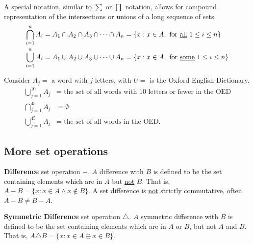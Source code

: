 A special notation, similar to $\sum$ or $\prod$ notation, allows for compound representation of the
intersections or unions of a long sequence of sets.
\begin{align*}
  \bigcap_{i=1}^{n} A_{i} & = A_1 \cap A_2 \cap A_3 \cap \cdots \cap A_n = \{x : x \in A, \text{ for \underline{all} } 1 \leq i \leq n\}  \\
  \bigcup_{i=1}^{n} A_{i} & = A_1 \cup A_2 \cup A_3 \cup \cdots \cup A_n = \{x : x \in A, \text{ for \underline{some} } 1 \leq i \leq n\} \\
\end{align*}

Consider $A_j =$ a word with $j$ letters, with $U =$ is the Oxford English Dictionary.
\begin{align*}
  \bigcup_{j=1}^{10} A_j & = \text{ the set of all words with 10 letters or fewer in the OED} \\
  \bigcap_{j=1}^{45} A_j & = \emptyset                                                        \\
  \bigcup_{j=1}^{45} A_j & = \text{ the set of all words in the OED.}
\end{align*}

\subsection{More set operations}

\textbf{Difference} set operation $-$.
$A$ difference with $B$ is defined to be the set containing elements which are in $A$ but \underline{not} $B$.
That is, $A - B = \{x: x \in A \land x \not \in B\}$. A set difference is \underline{not} strictly commutative, often
$A - B \not = B - A$.
\begin{center}
\end{center}

\noindent \textbf{Symmetric Difference} set operation $\triangle$.
$A$ symmetric difference with $B$ is defined to be the set containing elements which are in $A$ or $B$, but not $A$ and $B$.
That is, $A \triangle B = \{x: x \in A \oplus  x \in B\}$.
\begin{center}
\end{center}

